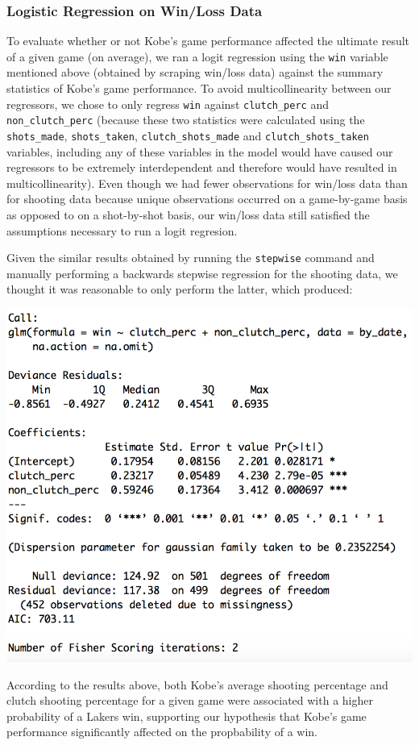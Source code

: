 \documentclass[paper=a4, fontsize=11pt]{scrartcl} %
\numberwithin{equation}{section} %
\numberwithin{figure}{section} %
\numberwithin{table}{section} %
\begin{document}
\subsubsection{Logistic Regression on Win/Loss Data}
\hspace*{1cm}To evaluate whether or not Kobe's game performance affected the ultimate result of a given game (on average), we ran a logit regression using the \texttt{win} variable mentioned above (obtained by scraping win/loss data) against the summary statistics of Kobe's game performance. To avoid multicollinearity between our regressors, we chose to only regress \texttt{win} against \texttt{clutch\_perc} and \texttt{non\_clutch\_perc} (because these two statistics were calculated using the \texttt{shots\_made}, \texttt{shots\_taken}, \texttt{clutch\_shots\_made} and \texttt{clutch\_shots\_taken} variables, including any of these variables in the model would have caused our regressors to be extremely interdependent and therefore would have resulted in multicollinearity). Even though we had fewer observations for win/loss data than for shooting data because unique observations occurred on a game-by-game basis as opposed to on a shot-by-shot basis, our win/loss data still satisfied the assumptions necessary to run a logit regresion. 

\hspace*{1cm}Given the similar results obtained by running the \texttt{stepwise} command and manually performing a backwards stepwise regression for the shooting data, we thought it was reasonable to only perform the latter, which produced:
\begin{center}
	\includegraphics[scale=0.6]{img/logitwins}
\end{center}
\hspace*{1cm}According to the results above, both Kobe's average shooting percentage and clutch shooting percentage for a given game were associated with a higher probability of a Lakers win, supporting our hypothesis that Kobe's game performance significantly affected on the propbability of a win. 
\end{document}
